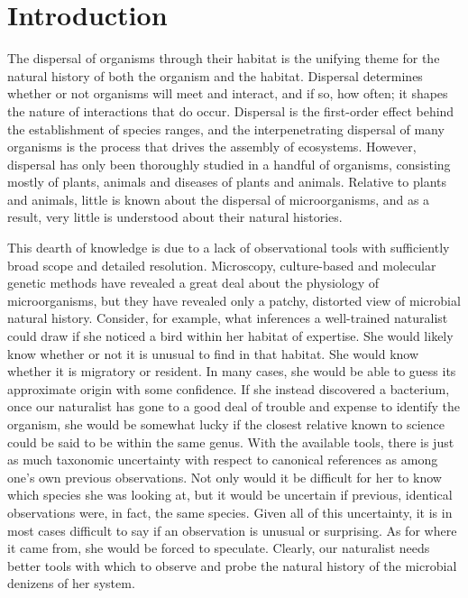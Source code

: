\section{Introduction}

The dispersal of organisms through their habitat is the unifying theme for the natural history of both the organism and the habitat. Dispersal determines whether or not organisms will meet and interact, and if so, how often; it shapes the nature of interactions that do occur. Dispersal is the first-order effect behind the establishment of species ranges, and the interpenetrating dispersal of many organisms is the process that drives the assembly of ecosystems. However, dispersal has only been thoroughly studied in a handful of organisms, consisting mostly of plants, animals and diseases of plants and animals. Relative to plants and animals, little is known about the dispersal of microorganisms, and as a result, very little is understood about their natural histories. 

This dearth of knowledge is due to a lack of observational tools with sufficiently broad scope and detailed resolution. Microscopy, culture-based and molecular genetic methods have revealed a great deal about the physiology of microorganisms, but they have revealed only a patchy, distorted view of microbial natural history. Consider, for example, what inferences a well-trained naturalist could draw if she noticed a bird within her habitat of expertise. She would likely know whether or not it is unusual to find in that habitat. She would know whether it is migratory or resident. In many cases, she would be able to guess its approximate origin with some confidence. If she instead discovered a bacterium, once our naturalist has gone to a good deal of trouble and expense to identify the organism, she would be somewhat lucky if the closest relative known to science could be said to be within the same genus. With the available tools, there is just as much taxonomic uncertainty with respect to canonical references as among one's own previous observations. Not only would it be difficult for her to know which species she was looking at, but it would be uncertain if previous, identical observations were, in fact, the same species. Given all of this uncertainty, it is in most cases difficult to say if an observation is unusual or surprising. As for where it came from, she would be forced to speculate. Clearly, our naturalist needs better tools with which to observe and probe the natural history of the microbial denizens of her system.

